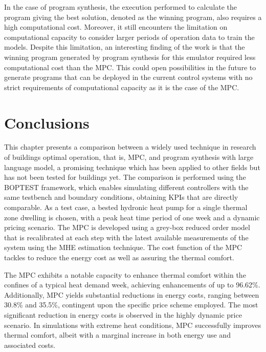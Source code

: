 In the case of program synthesis, the execution performed to calculate the program giving the best solution, denoted as the winning program, also requires a high computational cost. Moreover, it still encounters the limitation on computational capacity to consider larger periods of operation data to train the models. Despite this limitation, an interesting finding of the work is that the winning program generated by program synthesis for this emulator required less computational cost than the MPC. This could open possibilities in the future to generate programs that can be deployed in the current control systems with no strict requirements of computational capacity as it is the case of the MPC.

\newpage
\section{Conclusions}
\label{sec:boptest-conclusion}
This  chapter presents a comparison between a widely used technique in research of buildings optimal operation, that is, MPC, and program synthesis with large language model, a promising technique which has been applied to other fields but has not been tested for buildings yet. The comparison is performed using the BOPTEST framework, which enables simulating different controllers with the same testbench and boundary conditions, obtaining KPIs that are directly comparable. As a test case, a bested hydronic heat pump for a single thermal zone dwelling is chosen, with a peak heat time period of one week and a dynamic pricing scenario. The MPC is developed using a grey-box reduced order model that is recalibrated at each step with the latest available measurements of the system using the MHE estimation technique. The cost function of the MPC tackles to reduce the energy cost as well as assuring the thermal comfort. 

The MPC exhibits a notable capacity to enhance thermal comfort within the confines of a typical heat demand week, achieving enhancements of up to 96.62\%. Additionally, MPC yields substantial reductions in energy costs, ranging between 30.8\% and 35.5\%, contingent upon the specific price scheme employed. The most significant reduction in energy costs is observed in the highly dynamic price scenario. In simulations with extreme heat conditions, MPC successfully improves thermal comfort, albeit with a marginal increase in both energy use and associated costs.

